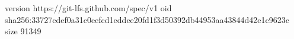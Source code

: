 version https://git-lfs.github.com/spec/v1
oid sha256:33727cdef0a31c0eefcd1eddee20fd1f3d50392db44953aa43844d42e1c9623c
size 91349
